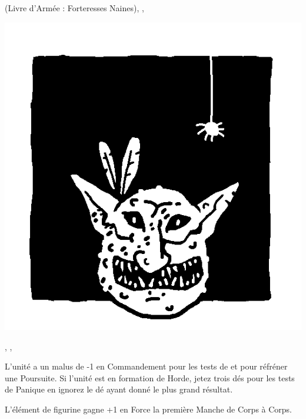 \begin{multicols}{3}
\begin{center}
\hatred{} (Livre d'Armée : Forteresses Naines), \unruly{}, \insignificant{}
\end{center}

\columnbreak

\begin{center}
\includegraphics[width=\logosize]{pics/forestgoblin.png}
\vspace*{-1cm}\subsubtitle{\forestgoblin}

\strider{\forest}, \unruly{}, \insignificant{}
\end{center}

\end{multicols}

\armyspecialruleentry{\unruly}

L'unité a un malus de -1 en Commandement pour les tests de \frenzy{} et pour réfréner une Poursuite. Si l'unité est en formation de Horde, jetez trois dés pour les tests de Panique en ignorez le dé ayant donné le plus grand résultat.

\armyspecialruleentry{\borntofight}

L'élément de figurine gagne +1 en Force la première Manche de Corps à Corps.


